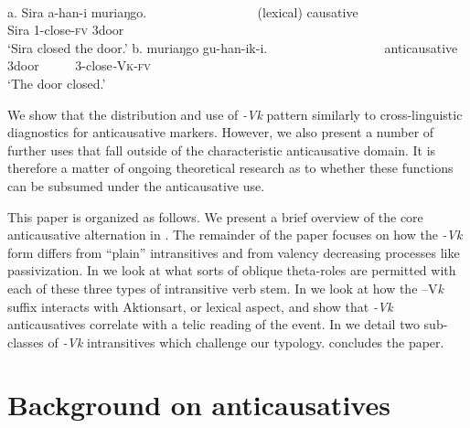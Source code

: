 \documentclass[output=paper]{langsci/langscibook}
\begin{document}
\ea
\ea
{}\\
\gll a.  Sira a-han-i       muriaŋgo.~~~ ~~~ ~~~ ~~~ ~~    (lexical) causative\\
       Sira 1-close-\textsc{fv} 3door\\
\glt ‘Sira closed the door.’
\ex
\gll b.  muriaŋgo gu-han-ik-i.~~~ ~~~ ~~~ ~~~ ~~~     anticausative\\
       3door ~~~~~3-close\textit{-}\textsc{Vk}-\textsc{fv}\\
\glt ‘The door closed.’
\z
\z

We show that the distribution and use of \textit{-Vk} pattern similarly to cross-linguistic diagnostics for anticausative markers. However, we also present a number of further uses that fall outside of the characteristic anticausative domain. It is therefore a matter of ongoing theoretical research as to whether these functions can be subsumed under the anticausative use.

  This paper is organized as follows. We present a brief overview of the core anticausative alternation in . The remainder of the paper focuses on how the \textit{-Vk }form differs from “plain” intransitives and from valency decreasing processes like passivization. In  we look at what sorts of oblique theta-roles are permitted with each of these three types of intransitive verb stem. In  we look at how the –V\textit{k }suffix interacts with Aktionsart, or lexical aspect, and show that \textit{-Vk} anticausatives correlate with a telic reading of the event. In  we detail two sub-classes of \textit{-Vk} intransitives which challenge our typology.  concludes the paper. 

\section{Background on anticausatives}
\end{document}
